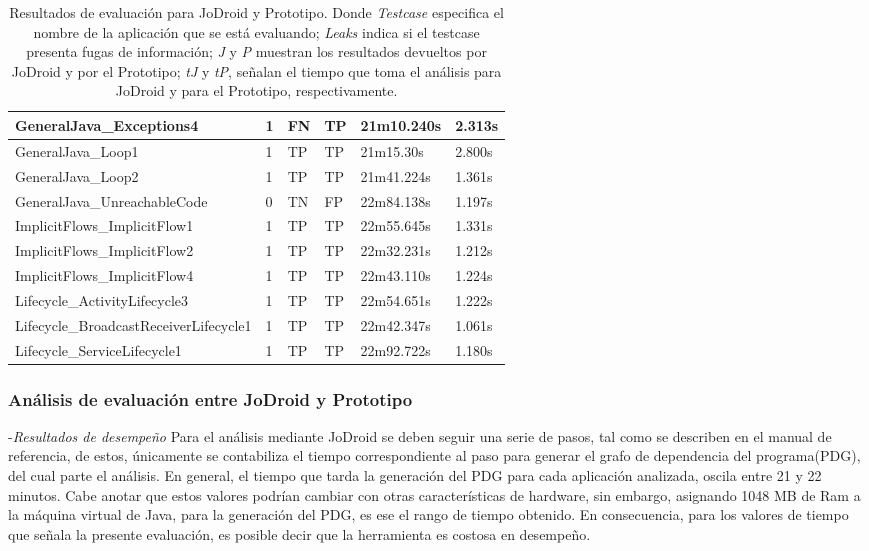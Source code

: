 \begin{table}[H]
\begin{center}
\begin{tabular}{|p{6cm}|p{1cm}|p{1cm}|p{1cm}|p{}|p{1cm}|}
	GeneralJava\_Exceptions4 & 1 & FN  & TP & 21m10.240s &2.313s\\
	\hline
	GeneralJava\_Loop1 & 1 & TP & TP &21m15.30s&2.800s\\
	\hline
	GeneralJava\_Loop2 & 1 & TP & TP &21m41.224s&1.361s\\
	\hline
	GeneralJava\_UnreachableCode & 0 & TN & FP &22m84.138s&1.197s\\
	\hline
	ImplicitFlows\_ImplicitFlow1 & 1 & TP & TP &22m55.645s&1.331s\\
	\hline
	ImplicitFlows\_ImplicitFlow2 & 1 & TP & TP &22m32.231s&1.212s\\
	\hline
	ImplicitFlows\_ImplicitFlow4 & 1 & TP & TP &22m43.110s&1.224s\\
	\hline
	Lifecycle\_ActivityLifecycle3 & 1 & TP & TP &22m54.651s&1.222s\\
	\hline
	Lifecycle\_BroadcastReceiverLifecycle1 & 1 & TP & TP &22m42.347s&1.061s\\
	\hline
	Lifecycle\_ServiceLifecycle1 & 1 & TP & TP &22m92.722s&1.180s\\
	\hline
\end{tabular}
\end{center}
\caption{Resultados de evaluación para JoDroid y Prototipo. Donde
\textit{Testcase} especifica el nombre de la aplicación que se está evaluando;
\textit{Leaks} indica si el testcase presenta fugas de información; \textit{J} y
\textit{P} muestran los resultados devueltos por JoDroid y por el Prototipo;
\textit{tJ} y \textit{tP}, señalan el tiempo que toma el análisis para JoDroid
y para el Prototipo, respectivamente.}
\label{tab:JoDroid-Prototipo}
\end{table}

\subsubsection{Análisis de evaluación entre JoDroid y Prototipo}
-\textit{Resultados de desempeño}\newline
Para el análisis mediante JoDroid se deben seguir una serie de pasos, tal como
se describen en el manual de referencia\cite{joDroidManual}, de estos,
únicamente se contabiliza el tiempo correspondiente al paso para generar el
grafo de dependencia del programa(PDG), del cual parte el análisis. En general,
el tiempo que tarda la generación del PDG para cada aplicación analizada, oscila
entre 21 y 22 minutos. Cabe anotar que estos valores podrían cambiar con otras
características de hardware, sin embargo, asignando 1048 MB de Ram a la máquina
virtual de Java, para la generación del PDG, es ese el rango de tiempo obtenido.
En consecuencia, para los valores de tiempo que señala la presente evaluación,
es posible decir que la herramienta es costosa en desempeño.

